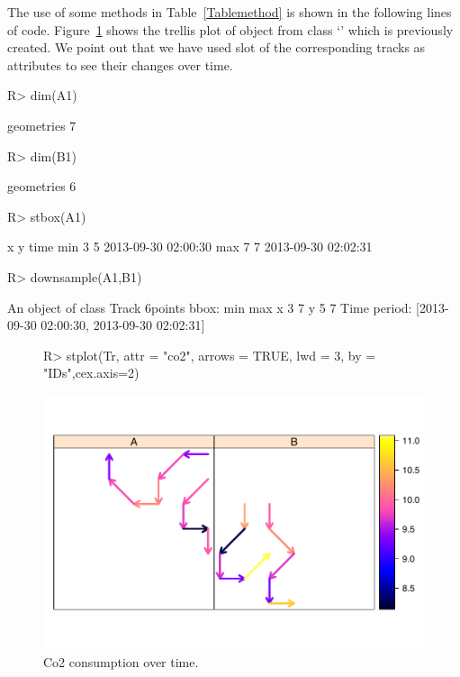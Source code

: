 \documentclass[article]{jss}
\newcommand{\class}[1]{`\code{#1}'}
\begin{document}
The use of some methods in Table~\ref{Tablemethod} is shown in the following lines of code. Figure~\ref{fig:co2consumptionovertime} shows the trellis plot of object  from class \class{TracksCollection} which is previously created. We point out that we have used slot  of the corresponding tracks as attributes to see their changes over time.
\begin{Sinput}
R> dim(A1)
\end{Sinput}
\begin{Soutput}
geometries 
         7 
\end{Soutput}
\begin{Sinput}
R> dim(B1)
\end{Sinput}
\begin{Soutput}
geometries 
         6 
\end{Soutput}
\begin{Sinput}
R> stbox(A1)
\end{Sinput}
\begin{Soutput}
    x y                time
min 3 5 2013-09-30 02:00:30
max 7 7 2013-09-30 02:02:31
\end{Soutput}
\begin{Sinput}
R> downsample(A1,B1)
\end{Sinput}
\begin{Soutput}
An object of class Track 
6points 
bbox: 
  min max
x   3   7
y   5   7
Time period: [2013-09-30 02:00:30, 2013-09-30 02:02:31]
\end{Soutput}
\begin{figure}[!h]
\centering
\begin{Sinput}
R> stplot(Tr, attr = "co2", arrows = TRUE, lwd = 3, by = "IDs",cex.axis=2)
\end{Sinput}
\includegraphics{article-011}
\caption{Co2 consumption over time.}
\label{fig:co2consumptionovertime}
\end{figure}
\end{document}
